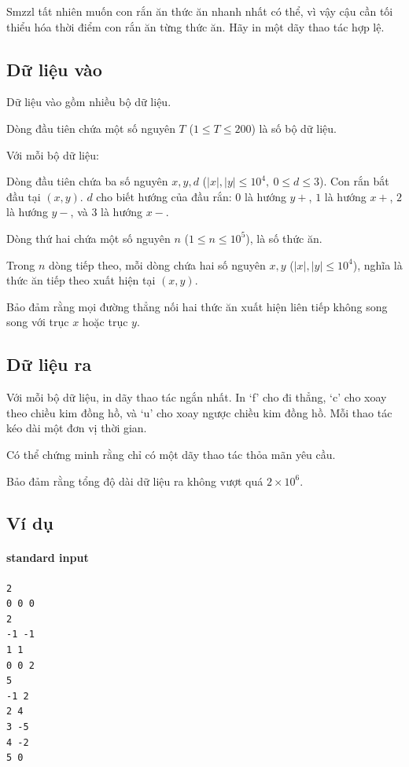 \documentclass[11pt]{article}
\begin{document}
Smzzl tất nhiên muốn con rắn ăn thức ăn nhanh nhất có thể, vì vậy cậu cần
tối thiểu hóa thời điểm con rắn ăn từng thức ăn. Hãy in một dãy thao tác hợp
lệ.

\subsection*{Dữ liệu vào}

Dữ liệu vào gồm nhiều bộ dữ liệu.

Dòng đầu tiên chứa một số nguyên \(T\) (\(1\le T\le 200\)) là số bộ dữ liệu.

Với mỗi bộ dữ liệu:

Dòng đầu tiên chứa ba số nguyên \(x,y,d\)
(\(|x|,|y|\le 10^4,\ 0\le d\le 3\)). Con rắn bắt đầu tại \((x,y)\). \(d\) cho
biết hướng của đầu rắn: \(0\) là hướng \(y+\), \(1\) là hướng \(x+\), \(2\) là
hướng \(y-\), và \(3\) là hướng \(x-\).

Dòng thứ hai chứa một số nguyên \(n\) (\(1\le n\le 10^5\)), là số thức ăn.

Trong \(n\) dòng tiếp theo, mỗi dòng chứa hai số nguyên \(x,y\)
(\(|x|,|y|\le 10^4\)), nghĩa là thức ăn tiếp theo xuất hiện tại \((x,y)\).

Bảo đảm rằng mọi đường thẳng nối hai thức ăn xuất hiện liên tiếp không song
song với trục \(x\) hoặc trục \(y\).

\subsection*{Dữ liệu ra}

Với mỗi bộ dữ liệu, in dãy thao tác ngắn nhất. In `f' cho đi thẳng, `c' cho
xoay theo chiều kim đồng hồ, và `u' cho xoay ngược chiều kim đồng hồ. Mỗi thao
tác kéo dài một đơn vị thời gian.

Có thể chứng minh rằng chỉ có một dãy thao tác thỏa mãn yêu cầu.

Bảo đảm rằng tổng độ dài dữ liệu ra không vượt quá \(2\times 10^6\).

\subsection*{Ví dụ}

\paragraph{standard input}
\begin{verbatim}
2
0 0 0
2
-1 -1
1 1
0 0 2
5
-1 2
2 4
3 -5
4 -2
5 0
\end{verbatim}
\end{document}
